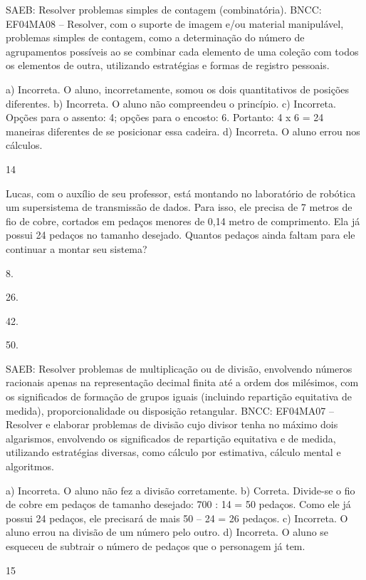 \begin{mdframed}[linewidth=2pt,linecolor=salmao,roundcorner=2pt]
\begin{escolha}
{\begin{escolha}
SAEB: Resolver problemas simples de contagem (combinatória).
BNCC: EF04MA08 -- Resolver, com o suporte de imagem e/ou material manipulável, problemas simples
de contagem, como a determinação do número de agrupamentos possíveis ao se combinar cada
elemento de uma coleção com todos os elementos de outra, utilizando estratégias e formas de
registro pessoais.

a) Incorreta. O aluno, incorretamente, somou os dois quantitativos de posições diferentes.
b) Incorreta. O aluno não compreendeu o princípio.
c) Incorreta. Opções para o assento: 4; opções para o encosto: 6. Portanto: 4 x 6 = 24 maneiras diferentes de se posicionar essa cadeira.
d) Incorreta. O aluno errou nos cálculos.

\num{14}

Lucas, com o auxílio de seu professor, está montando no laboratório de
robótica um supersistema de transmissão de dados. Para isso, ele
precisa de 7 metros de fio de cobre, cortados em pedaços menores de 0,14
metro de comprimento. Ela já possui 24 pedaços no tamanho desejado. Quantos pedaços ainda
faltam para ele continuar a montar seu sistema?

\begin{escolha}
\item
  8.
\item
  26.
\item
  42.
\item
  50.
\end{escolha}

SAEB: Resolver problemas de multiplicação ou de divisão,
envolvendo números racionais apenas na representação decimal finita até
a ordem dos milésimos, com os significados de formação de grupos iguais
(incluindo repartição equitativa de medida), proporcionalidade ou
disposição retangular.
BNCC: EF04MA07 -- Resolver e elaborar problemas de divisão cujo divisor tenha no máximo dois algarismos,
envolvendo os significados de repartição equitativa e de medida, utilizando estratégias diversas,
como cálculo por estimativa, cálculo mental e algoritmos.

a) Incorreta. O aluno não fez a divisão corretamente.
b) Correta. Divide-se o fio de cobre em pedaços de tamanho desejado: 700 : 14 = 50
pedaços. Como ele já possui 24 pedaços, ele precisará de mais 50 -- 24 = 26 pedaços.
c) Incorreta. O aluno errou na divisão de um número pelo outro.
d) Incorreta. O aluno se esqueceu de subtrair o número de pedaços que o personagem já tem.

\num{15}


\end{escolha}}
\end{escolha}
\end{mdframed}
